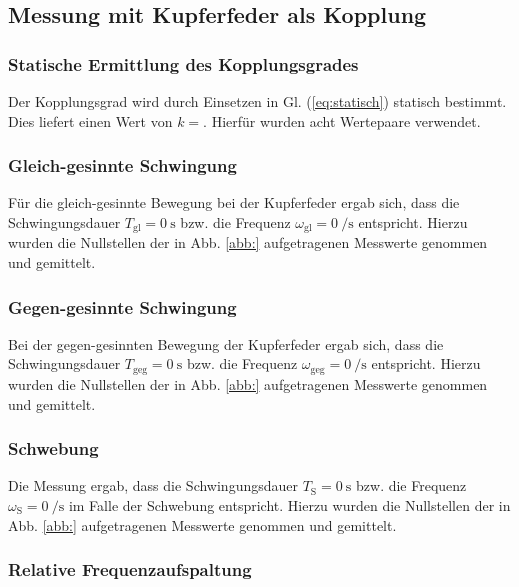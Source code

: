 \documentclass[11pt,a4paper,titlepage, ngerman]{article}
\newcommand{\refeq}[1]{Gl. (\ref{eq:#1})}
\newcommand{\refabb}[1]{Abb. \ref{abb:#1}}
\begin{document}
		\subsection{Messung mit Kupferfeder als Kopplung}
			
			\subsubsection{Statische Ermittlung des Kopplungsgrades}							
				
				Der Kopplungsgrad wird durch Einsetzen in \refeq{statisch} statisch bestimmt. Dies liefert einen Wert von $k=$. Hierfür wurden acht Wertepaare verwendet. 
				
			\subsubsection{Gleich-gesinnte Schwingung}
			
				Für die gleich-gesinnte Bewegung bei der Kupferfeder ergab sich, dass die Schwingungsdauer $T_\text{gl} = \SI{0}{\s}$ bzw. die Frequenz $\omega_\text{gl}  = \SI{0}{\per\s}$ entspricht. Hierzu wurden die Nullstellen der in \refabb{} aufgetragenen Messwerte genommen und gemittelt. 
			
			\subsubsection{Gegen-gesinnte Schwingung}
				
				Bei der gegen-gesinnten Bewegung der Kupferfeder ergab sich, dass die Schwingungsdauer $T_\text{geg} = \SI{0}{\s}$ bzw. die Frequenz $\omega_\text{geg}  = \SI{0}{\per\s}$ entspricht. Hierzu wurden die Nullstellen der in \refabb{} aufgetragenen Messwerte genommen und gemittelt. 
				
			\subsubsection{Schwebung}
				
				Die Messung ergab, dass die Schwingungsdauer $T_\text{S} = \SI{0}{\s}$ bzw. die Frequenz $\omega_\text{S} = \SI{0}{\per\s}$ im Falle der Schwebung entspricht. Hierzu wurden die Nullstellen der in \refabb{} aufgetragenen Messwerte genommen und gemittelt. 
				
			\subsubsection{Relative Frequenzaufspaltung}
				
\end{document}
